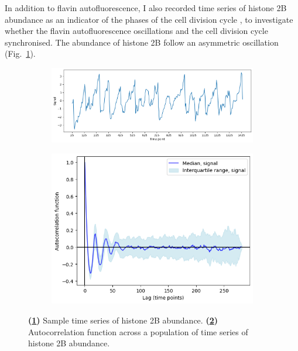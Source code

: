 In addition to flavin autofluorescence, I also recorded time series of histone 2B abundance as an indicator of the phases of the cell division cycle \parencite{garmendia-torresMultipleInputsEnsure2018}, to investigate whether the flavin autofluorescence oscillations and the cell division cycle synchronised.
The abundance of histone 2B follow an asymmetric oscillation (Fig.\ \ref{fig:acf-fhn-biol-ts}).

\begin{figure}
  \centering
  \begin{subfigure}[t]{0.6\textwidth}
  \centering
    \includegraphics[width=\linewidth]{acf_fhn_biol_ts.png}
    \caption{
    }
    \label{fig:acf-fhn-biol-ts}
  \end{subfigure}%
  \begin{subfigure}[t]{0.4\textwidth}
  \centering
    \includegraphics[width=\linewidth]{acf_fhn_biol_acf.png}
    \caption{
    }
    \label{fig:acf-fhn-biol-acf}
  \end{subfigure}


  \caption[
    Sample time series of histone 2B abundance, its autocorrelation function.
  ]{
    \textbf{(\ref{fig:acf-fhn-biol-ts})}
    Sample time series of histone 2B abundance.
    \textbf{(\ref{fig:acf-fhn-biol-acf})}
    Autocorrelation function across a population of time series of histone 2B abundance.
  }
  \label{fig:acf-fhn-biol}
\end{figure}

